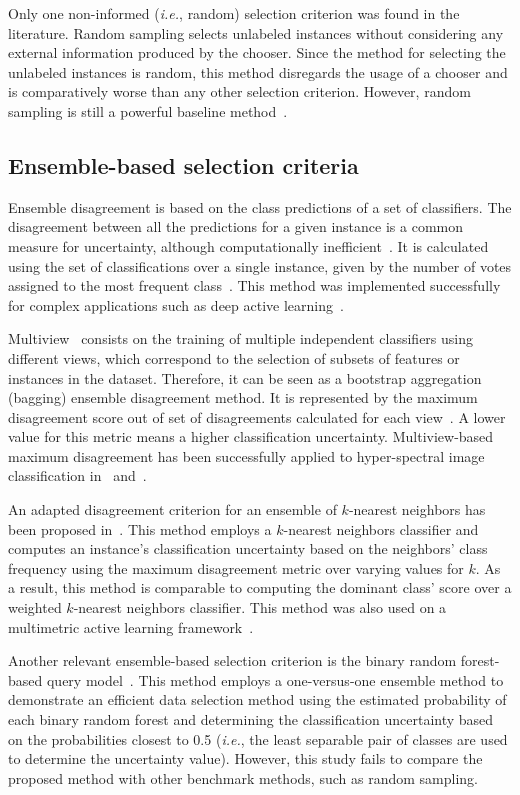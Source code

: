 \documentclass[preprint,12pt]{elsarticle}
\begin{document}
Only one non-informed (\textit{i.e.}, random) selection criterion was found in
the literature. Random sampling selects unlabeled instances without
considering any external information produced by the chooser. Since the method
for selecting the unlabeled instances is random, this method disregards the
usage of a chooser and is comparatively worse than any other selection
criterion. However, random sampling is still a powerful baseline
method~\cite{Cawley2011}. 

\subsection{Ensemble-based selection criteria}

Ensemble disagreement is based on the class predictions of a set of
classifiers. The disagreement between all the predictions for a given
instance is a common measure for uncertainty, although computationally
inefficient~\cite{Ruzicka2020,Pasolli2016}. It is calculated using the set of
classifications over a single instance, given by the number of votes
assigned to the most frequent class~\cite{Shrivastava2021}. This method was
implemented successfully for complex applications such as deep active
learning~\cite{Ruzicka2020}.

Multiview~\cite{Muslea2006} consists on the training of multiple independent
classifiers using different views, which correspond to the selection of subsets
of features or instances in the dataset. Therefore, it can be seen as a
bootstrap aggregation (bagging) ensemble disagreement method. It is represented
by the maximum disagreement score out of set of disagreements calculated for
each view~\cite{Shrivastava2021}. A lower value for this metric means a higher
classification uncertainty. Multiview-based maximum disagreement has been
successfully applied to hyper-spectral image classification in~\cite{Di2012}
and~\cite{Zhou2014}.

An adapted disagreement criterion for an ensemble of $k$-nearest neighbors has
been proposed in~\cite{Pasolli2016}. This method employs a $k$-nearest
neighbors classifier and computes an instance's classification uncertainty
based on the neighbors' class frequency using the maximum disagreement metric
over varying values for $k$. As a result, this method is comparable to
computing the dominant class' score over a weighted $k$-nearest neighbors
classifier. This method was also used on a multimetric active learning
framework~\cite{Zhang2016}.

Another relevant ensemble-based selection criterion is the binary random
forest-based query model~\cite{Su2020}. This method employs a one-versus-one
ensemble method to demonstrate an efficient data selection method using the
estimated probability of each binary random forest and determining the
classification uncertainty based on the probabilities closest to 0.5
(\textit{i.e.}, the least separable pair of classes are used to determine the
uncertainty value). However, this study fails to compare the proposed method
with other benchmark methods, such as random sampling.
\end{document}
